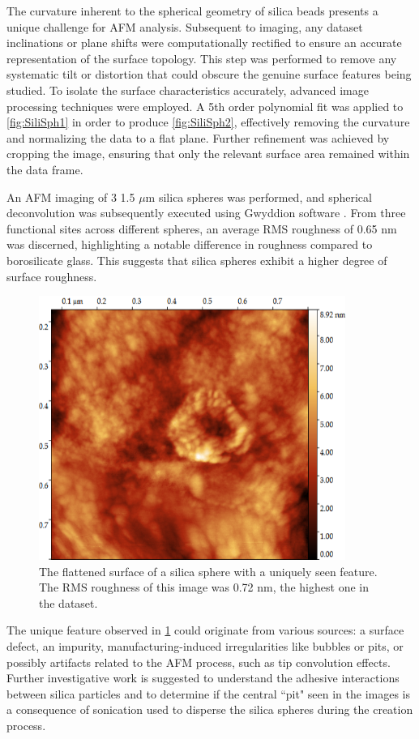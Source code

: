 The curvature inherent to the spherical geometry of silica beads presents a unique challenge for AFM analysis. Subsequent to imaging, any dataset inclinations or plane shifts were computationally rectified to ensure an accurate representation of the surface topology. This step was performed to remove any systematic tilt or distortion that could obscure the genuine surface features being studied. To isolate the surface characteristics accurately, advanced image processing techniques were employed. A 5th order polynomial fit was applied to \ref{fig:SiliSph1} in order to produce \ref{fig:SiliSph2}, effectively removing the curvature and normalizing the data to a flat plane. Further refinement was achieved by cropping the image, ensuring that only the relevant surface area remained within the data frame.

An AFM imaging of 3 1.5 $\mu$m silica spheres was performed, and spherical deconvolution was subsequently executed using Gwyddion software \cite{gwy}. From three functional sites across different spheres, an average RMS roughness of 0.65 nm was discerned, highlighting a notable difference in roughness compared to borosilicate glass. This suggests that silica spheres exhibit a higher degree of surface roughness.

\begin{figure}[h!!!!!]     %
        \begin{center}
          \includegraphics[width=100mm]{chapter3/Sili2.png}
\end{center}
\caption{The flattened surface of a silica sphere with a uniquely seen feature. The RMS roughness of this image was 0.72 nm, the highest one in the dataset.}
\label{fig:SiliSph3}                 %
\end{figure}

The unique feature observed in \ref{fig:SiliSph3} could originate from various sources: a surface defect, an impurity, manufacturing-induced irregularities like bubbles or pits, or possibly artifacts related to the AFM process, such as tip convolution effects. Further investigative work is suggested to understand the adhesive interactions between silica particles and to determine if the central ``pit" seen in the images is a consequence of sonication used to disperse the silica spheres during the creation process. \cite{SilicaGrowth}

\newpage